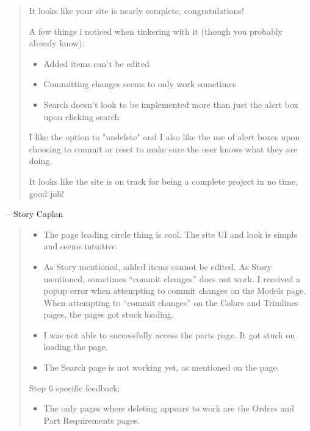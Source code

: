 \documentclass[11pt,letterpaper,oneside]{amsart}
\begin{document}
\begin{tcolorbox}
\begin{quotation}
It looks like your site is nearly complete, congratulations! 
 
A few things i noticed when tinkering with it (though you probably already know):
 
\begin{itemize}
\item Added items can't be edited

\item Committing changes seems to only work sometimes

\item Search doesn't look to be implemented more than just the alert box upon clicking search

\end{itemize} 

I like the option to "undelete" and I also like the use of alert boxes upon choosing to commit or reset to make sure the user knows what they are doing. 
 

It looks like the site is on track for being a complete project in no time, good job!

\end{quotation}

---Story Caplan
\end{tcolorbox}


\begin{tcolorbox} \begin{quotation}

\begin{itemize}

\item The page loading circle thing is cool. The site UI and look is simple and seems intuitive.
\item           As Story mentioned, added items cannot be edited.
           As Story mentioned, sometimes “commit changes” does not work. I received a popup error when attempting to commit changes on the Models page. When attempting to “commit changes” on the Colors and Trimlines pages, the pages got stuck loading.
\item           I was not able to successfully access the parts page. It got stuck on loading the page.
\item          The Search page is not working yet, as mentioned on the page.

\end{itemize}

Step 6 specific feedback:
 

 \begin{itemize}
 \item          The only pages where deleting appears to work are the Orders and Part Requirements pages.
 \end{itemize}

\end{quotation} \end{tcolorbox}
\end{document}
